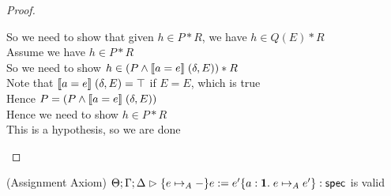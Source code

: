 \begin{proof}
\begin{tabbedproof}
\oooo So we need to show that given $h \in P * R$, we have $h \in Q(E) * R$ \\
\ooooo Assume we have $h \in P * R$ \\
\ooooo So we need to show $h \in (P \land [\![{a = e}]\!]\;(\delta,E)) * R$ \\
\ooooo Note that $[\![{a = e}]\!]\;(\delta,E) = \top$ if $E = E$, which is true \\
\ooooo Hence $P = (P \land [\![{a = e}]\!]\;(\delta,E))$ \\
\ooooo Hence we need to show $h \in P * R$ \\
\ooooo This is a hypothesis, so we are done \\
\end{tabbedproof}
\end{proof}


\begin{lemma}{(Assignment Axiom)}
${\Theta; \Gamma; \Delta} \vartriangleright {\{{e \mapsto_A -}\}{e := e'}\{{a:\mathbf{1}}.\;{e \mapsto_A e'}\}} : \mathsf{spec}$ is valid  
\end{lemma}
